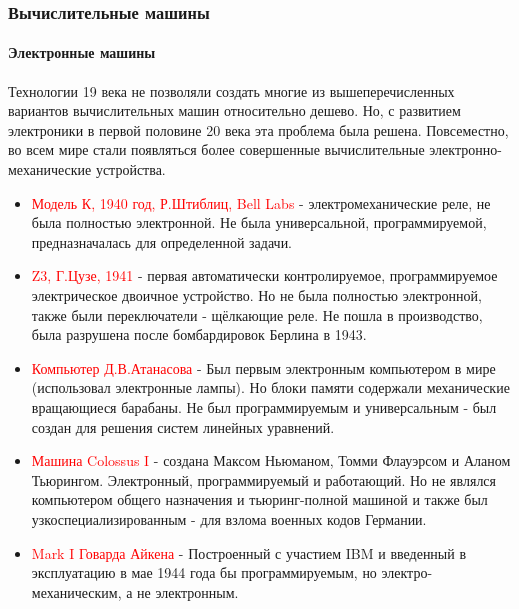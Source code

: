 \documentclass[aspectratio=169]{beamer}
\begin{document}
\begin{frame}
\frametitle{Вычислительные машины}
\framesubtitle{Электронные машины}
\justifying
\scriptsize
Технологии 19 века не позволяли создать многие из вышеперечисленных вариантов вычислительных машин относительно дешево. Но, с развитием электроники в первой половине 20 века эта проблема была решена.
Повсеместно, во всем мире стали появляться более совершенные вычислительные электронно-механические устройства.
\begin{itemize}
\item{\textcolor{red}{Модель К, 1940 год, Р.Штиблиц, Bell Labs} - электромеханические реле, не была полностью электронной. Не была универсальной, программируемой, предназначалась для определенной задачи.}

\item{\textcolor{red}{Z3, Г.Цузе, 1941} - первая автоматически контролируемое, программируемое электрическое двоичное устройство. Но не была полностью электронной, также были переключатели - щёлкающие реле. Не пошла в производство, была разрушена после бомбардировок Берлина в 1943.}

\item{\textcolor{red}{Компьютер Д.В.Атанасова} - Был первым электронным компьютером в мире (использовал электронные лампы). Но блоки памяти содержали механические вращающиеся барабаны. Не был программируемым и универсальным - был создан для решения систем линейных уравнений.
}

\item{\textcolor{red}{Машина Colossus I} - создана Максом Ньюманом, Томми Флауэрсом и Аланом Тьюрингом. Электронный, программируемый и работающий. Но не являлся компьютером общего назначения и тьюринг-полной машиной и также был узкоспециализированным - для взлома военных кодов Германии.}

\item{\textcolor{red}{Mark I Говарда Айкена} - Построенный с участием IBM и введенный в эксплуатацию в мае 1944 года бы программируемым, но электро-механическим, а не электронным.}

\end{itemize}
\end{frame}
\end{document}
